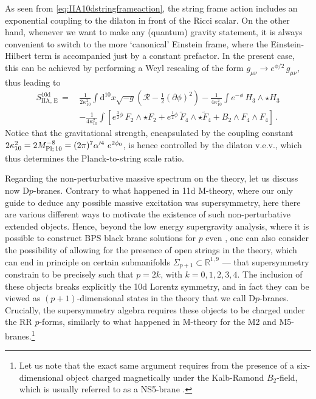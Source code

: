 As seen from \eqref{eq:IIA10dstringframeaction}, the string frame action includes an exponential coupling to the dilaton in front of the Ricci scalar. On the other hand, whenever we want to make any (quantum) gravity statement, it is always convenient to switch to the more `canonical' Einstein frame, where the Einstein-Hilbert term is accompanied just by a constant prefactor. In the present case, this can be achieved by performing a Weyl rescaling of the form $g_{\mu \nu} \to e^{\phi/2}\, g_{\mu \nu}$, thus leading to
%
\begin{equation}
			\begin{aligned}\label{eq:IIA10dEinsteinframeaction}
				S_\text{IIA, E}^{\text{10d}} \, =\, &\frac{1}{2\kappa_{10}^2} \int \text{d}^{10}x\sqrt{-g} \left(\mathcal{R}-\frac{1}{2}(\partial \phi)^2\right)-\frac{1}{4\kappa_{10}^2}\int e^{-\phi}\, H_3\wedge \star H_3 \\
				&-\frac{1}{4\kappa_{10}^2}\int \left[e^{\frac{3}{2}\phi}\, F_2 \wedge \star F_2 + e^{\frac{1}{2}\phi}\, \tilde F_4 \wedge \star \tilde F_4 + B_2\wedge F_4 \wedge F_4\right]\, . 
			\end{aligned}
\end{equation}
%
Notice that the gravitational strength, encapsulated by the coupling constant $2\kappa_{10}^2= 2 \Mpt^{-8}= (2 \pi)^{7} \alpha'^4\ e^{2 \phi_0}$, is hence controlled by the dilaton v.e.v., which thus determines the Planck-to-string scale ratio. 

Regarding the non-perturbative massive spectrum on the theory, let us discuss now D$p$-branes. Contrary to what happened in 11d M-theory, where our only guide to deduce any possible massive excitation was supersymmetry, here there are various different ways to motivate the existence of such non-perturbative extended objects. Hence, beyond the low energy supergravity analysis, where it is possible to construct BPS black brane solutions for $p$ even \cite{Horowitz:1991cd}, one can also consider the possibility of allowing for the presence of open strings in the theory, which can end in principle on certain submanifolds $\Sigma_{p+1} \subset \mathbb{R}^{1, 9}$ \cite{Dai:1989ua,Horava:1989ga,Polchinski:1995mt} --- that supersymmetry constrain to be precisely such that $p=2k$, with $k=0,1,2,3, 4$. The inclusion of these objects breaks explicitly the 10d Lorentz symmetry, and in fact they can be viewed as $(p+1)$-dimensional states in the theory that we call D$p$-branes. Crucially, the supersymmetry algebra requires these objects to be charged under the RR $p$-forms, similarly to what happened in M-theory for the M2 and M5-branes.\footnote{Let us note that the exact same argument requires from the presence of a six-dimensional object charged magnetically under the Kalb-Ramond $B_2$-field, which is usually referred to as a NS5-brane \cite{Strominger:1990et}.}
 
